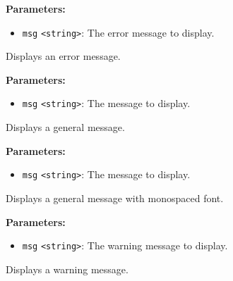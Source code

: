 \documentclass[12pt,a4paper]{article}
\begin{document}
\vspace{5mm}
\noindent {}


\noindent \textbf{Parameters:}
\begin{itemize}
  \item \texttt{msg} \texttt{<string>}: The error message to display.
\end{itemize}

\noindent Displays an error message.

\vspace{5mm}
\noindent {}


\noindent \textbf{Parameters:}
\begin{itemize}
  \item \texttt{msg} \texttt{<string>}: The message to display.
\end{itemize}

\noindent Displays a general message.

\vspace{5mm}
\noindent {}


\noindent \textbf{Parameters:}
\begin{itemize}
  \item \texttt{msg} \texttt{<string>}: The message to display.
\end{itemize}

\noindent Displays a general message with monospaced font.

\vspace{5mm}
\noindent {}


\noindent \textbf{Parameters:}
\begin{itemize}
  \item \texttt{msg} \texttt{<string>}: The warning message to display.
\end{itemize}

\noindent Displays a warning message.

\vspace{5mm}
\noindent {}
\end{document}
